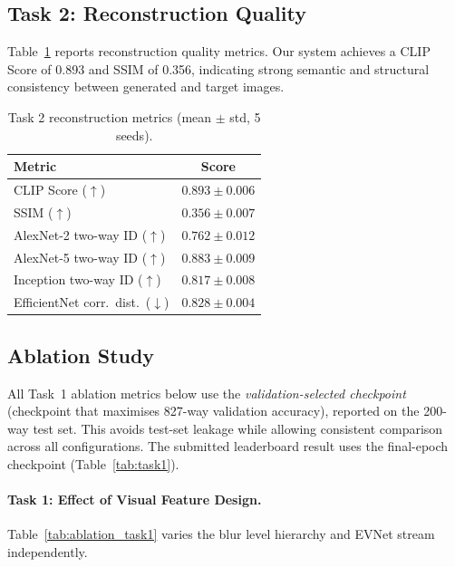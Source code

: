 \documentclass[11pt]{article}
\begin{document}
\subsection{Task 2: Reconstruction Quality}

Table~\ref{tab:task2rec} reports reconstruction quality metrics.
Our system achieves a CLIP Score of 0.893 and SSIM of 0.356, indicating strong semantic and structural consistency between generated and target images.

\begin{table}[H]
\centering
\caption{Task 2 reconstruction metrics (mean $\pm$ std, 5 seeds).}
\label{tab:task2rec}
\begin{tabular}{lc}
\toprule
\textbf{Metric} & \textbf{Score} \\
\midrule
CLIP Score ($\uparrow$)              & $0.893 \pm 0.006$ \\
SSIM ($\uparrow$)                    & $0.356 \pm 0.007$ \\
AlexNet-2 two-way ID ($\uparrow$)    & $0.762 \pm 0.012$ \\
AlexNet-5 two-way ID ($\uparrow$)    & $0.883 \pm 0.009$ \\
Inception two-way ID ($\uparrow$)    & $0.817 \pm 0.008$ \\
EfficientNet corr.\ dist.\ ($\downarrow$) & $0.828 \pm 0.004$ \\
\bottomrule
\end{tabular}
\end{table}

\subsection{Ablation Study}

All Task~1 ablation metrics below use the \emph{validation-selected checkpoint} (checkpoint that maximises 827-way validation accuracy), reported on the 200-way test set.
This avoids test-set leakage while allowing consistent comparison across all configurations.
The submitted leaderboard result uses the final-epoch checkpoint (Table~\ref{tab:task1}).

\paragraph{Task 1: Effect of Visual Feature Design.}
Table~\ref{tab:ablation_task1} varies the blur level hierarchy and EVNet stream independently.
\end{document}
